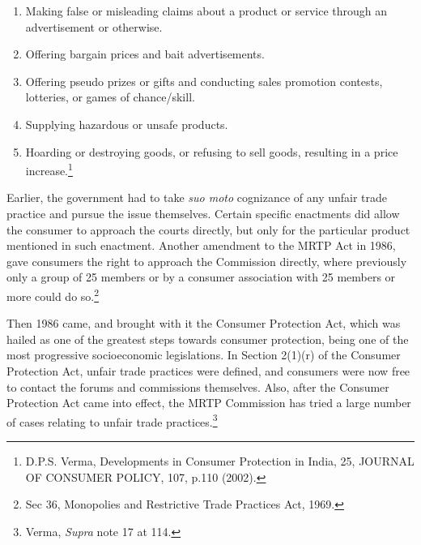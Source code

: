 \begin{multicols}{2}
\vspace{-.2cm}

\begin{enumerate}
\itemsep=0pt

\item[1)] Making false or misleading claims about a product or service through an advertisement or otherwise.

\item[2)] Offering bargain prices and bait advertisements.

\item[3)] Offering pseudo prizes or gifts and conducting sales promotion contests, lotteries, or games of chance/skill.

\item[4)] Supplying hazardous or unsafe products.

\item[5)] Hoarding or destroying goods, or refusing to sell goods, resulting in a price increase.\footnote{D.P.S. Verma, Developments in Consumer Protection in India, 25, JOURNAL OF CONSUMER POLICY, 107, p.110 (2002).}
\end{enumerate}

\vspace{-.2cm}

\noi
Earlier, the government had to take \textit{suo moto} cognizance of any unfair trade practice and pursue
the issue themselves. Certain specific enactments did allow the consumer to approach the courts
directly, but only for the particular product mentioned in such enactment. Another amendment
to the MRTP Act in 1986, gave consumers the right to approach the Commission directly,
where previously only a group of 25 members or by a consumer association with 25 members
or more could do so.\footnote{Sec 36, Monopolies and Restrictive Trade Practices Act, 1969.}

\vspace{-.1cm}

\noi
Then 1986 came, and brought with it the Consumer Protection Act, which was hailed as one of
the greatest steps towards consumer protection, being one of the most progressive socioeconomic legislations. In Section 2(1)(r) of the Consumer Protection Act, unfair trade practices
were defined, and consumers were now free to contact the forums and commissions
themselves. Also, after the Consumer Protection Act came into effect, the MRTP Commission
has tried a large number of cases relating to unfair trade practices.\footnote{Verma, \textit{Supra} note 17 at 114.}


\end{multicols}

